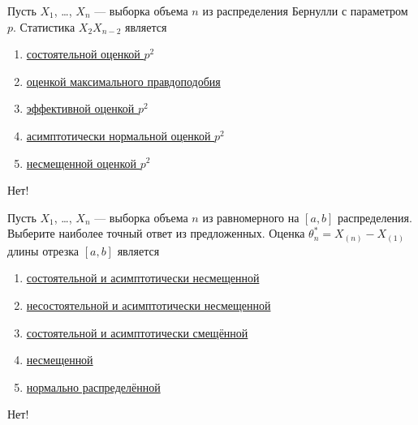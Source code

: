\documentclass[t]{beamer}
\begin{document}
 \begin{frame} \label{6-No} 
\begin{block}{6} 

Пусть $X_1$, \ldots, $X_n$ — выборка объема $n$ из распределения Бернулли с параметром $p$. Статистика $X_2 X_{n-2}$ является
 


 \end{block} 
\begin{enumerate} 
\item[] \hyperlink{6-No}{\beamergotobutton{} состоятельной оценкой $p^2$}
\item[] \hyperlink{6-No}{\beamergotobutton{} оценкой максимального правдоподобия}
\item[] \hyperlink{6-No}{\beamergotobutton{} эффективной оценкой $p^2$}
\item[] \hyperlink{6-No}{\beamergotobutton{} асимптотически нормальной оценкой $p^2$}
\item[] \hyperlink{6-Yes}{\beamergotobutton{} несмещенной оценкой $p^2$}
\end{enumerate} 

 \alert{Нет!} 
\end{frame} 


 \begin{frame} \label{7-No} 
\begin{block}{7} 

Пусть $X_1$, \ldots, $X_n$ — выборка объема $n$ из равномерного на $[a, b]$ распределения. Выберите наиболее точный ответ из предложенных. Оценка $\theta^*_n = X_{(n)}-X_{(1)}$ длины отрезка $[a,b]$ является
 


 \end{block} 
\begin{enumerate} 
\item[] \hyperlink{7-Yes}{\beamergotobutton{} состоятельной и асимптотически несмещенной}
\item[] \hyperlink{7-No}{\beamergotobutton{} несостоятельной и асимптотически несмещенной}
\item[] \hyperlink{7-No}{\beamergotobutton{} состоятельной и асимптотически смещённой}
\item[] \hyperlink{7-No}{\beamergotobutton{} несмещенной}
\item[] \hyperlink{7-No}{\beamergotobutton{} нормально распределённой}
\end{enumerate} 

 \alert{Нет!} 
\end{frame} 
\end{document}
